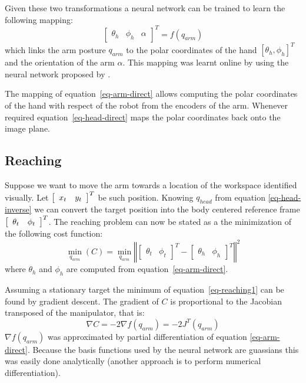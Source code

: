 Given these two transformations a neural network can be trained to
learn the following mapping:
%
\begin{equation}
  \left[\begin{array}{ccc}
    \theta_h & \phi_h & \alpha
    \end{array}\right]^T
  = f \left(q_{arm}\right)
\label{eq-arm-direct}
\end{equation}
%
which links the arm posture $q_{arm}$ to the polar coordinates of
the hand $\left[\theta_h, \phi_h\right]^T$ and the orientation of the
arm $\alpha$. This mapping was learnt online by using the neural network
proposed by \cite{schaal98Constructive}.

The mapping of equation~\ref{eq-arm-direct} allows computing 
the polar coordinates of the hand with respect of the robot 
from the encoders of the arm. Whenever required 
equation~\ref{eq-head-direct} maps the polar coordinates
back onto the image plane.

\subsection{Reaching}
\label{sec:reaching}
%
Suppose we want to move the arm towards a
location of the workspace identified visually. Let
$\left[\begin{array}{c c} x_t & y_t\end{array}\right]^T$ be such
position. Knowing $q_{head}$ from equation \ref{eq-head-inverse}
we can convert the target position into the body centered
reference frame $\left[\begin{array}{c c} \theta_t  &
\phi_t\end{array}\right]^T$. The reaching problem can now be stated
as a the minimization of the following cost function:
%
\begin{equation}
  \displaystyle\min_{q_{arm}}\left(C\right)=\displaystyle\min_{q_{arm}}
  \left\Vert
  \left[
  \begin{array}{cc}
    \theta_t & \phi_t 
    \end{array}\right]^T
  -
  \left[\begin{array}{cc}
  \theta_h & \phi_h\end{array}
  \right]^T
  \right\Vert^2
\label{eq-reaching1}
\end{equation}
%
where $\theta_h$ and $\phi_h$ are computed from equation~\ref{eq-arm-direct}.

Assuming a stationary target the minimum of equation~\ref{eq-reaching1}
can be found by gradient descent. The gradient of $C$ is proportional
to the Jacobian transposed of the manipulator, that is:
%
\begin{equation}
  \nabla C=-2\nabla f\left(q_{arm}\right)=-2J^T\left(q_{arm}\right)
\label{eq-gradient}
\end{equation}
%
$\nabla f\left(q_{arm}\right)$ was approximated by partial
 differentiation of equation \ref{eq-arm-direct}. Because 
the basis functions used by the neural network are guassians
this was easily done analytically (another approach is to perform
numerical differentiation).

